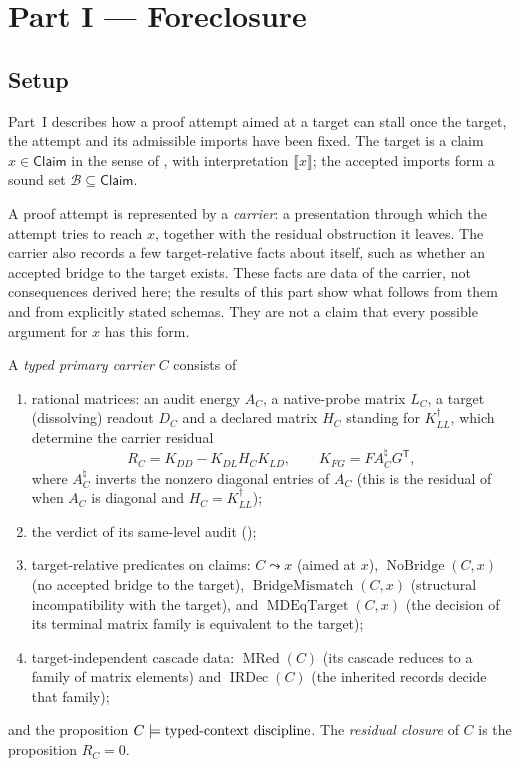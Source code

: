 \section{Part I --- Foreclosure}\label{sec:foreclosure}

\subsection{Setup}\label{sec:foreclosure:setup}

Part~I describes how a proof attempt aimed at a target can stall once
the target, the attempt and its admissible imports have been fixed.
The target is a claim \(x\in\mathsf{Claim}\) in the sense of
, with interpretation
\(\llbracket x\rrbracket\); the accepted imports form a sound set
\(\mathcal B\subseteq\mathsf{Claim}\).

A proof attempt is represented by a \emph{carrier}: a presentation
through which the attempt tries to reach \(x\), together with the
residual obstruction it leaves.  The carrier also records a few
target-relative facts about itself, such as whether an accepted bridge
to the target exists.  These facts are data of the carrier, not
consequences derived here; the results of this part show what follows
from them and from explicitly stated schemas.  They are not a claim
that every possible argument for \(x\) has this form.

\begin{definition}\label{def:typed-primary-carrier}
A \emph{typed primary carrier} \(C\) consists of
\begin{enumerate}
\item rational matrices: an audit energy \(A_{C}\), a native-probe
  matrix \(L_{C}\), a target (dissolving) readout \(D_{C}\) and a
  declared matrix \(H_{C}\) standing for \(K_{LL}^{\dagger}\), which
  determine the carrier residual
  \[
    R_{C}=K_{DD}-K_{DL}H_{C}K_{LD},\qquad K_{FG}=FA_{C}^{\natural}G^{\mathsf T},
  \]
  where \(A_{C}^{\natural}\) inverts the nonzero diagonal entries of
  \(A_{C}\) (this is the residual of  when
  \(A_{C}\) is diagonal and \(H_{C}=K_{LL}^{\dagger}\));
\item the verdict of its same-level audit
  ();
\item target-relative predicates on claims: \(C\leadsto x\) (aimed
  at \(x\)), \(\operatorname{NoBridge}(C,x)\) (no accepted bridge to
  the target), \(\operatorname{BridgeMismatch}(C,x)\) (structural
  incompatibility with the target), and
  \(\operatorname{MDEqTarget}(C,x)\) (the decision of its terminal
  matrix family is equivalent to the target);
\item target-independent cascade data: \(\operatorname{MRed}(C)\) (its
  cascade reduces to a family of matrix elements) and
  \(\operatorname{IRDec}(C)\) (the inherited records decide that family);
\end{enumerate}
and the proposition \(C\models\text{typed-context discipline}\).  The \emph{residual
closure} of \(C\) is the proposition \(R_{C}=0\).
\end{definition}

